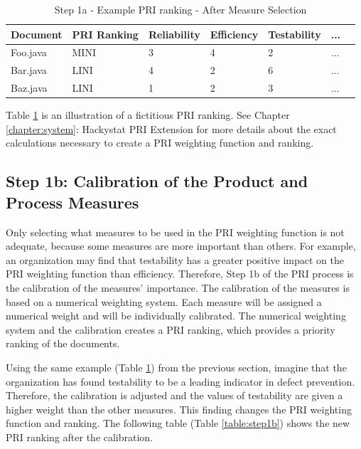 \begin{table}[htbp]
  \caption{Step 1a - Example PRI ranking - After Measure Selection}
  \label{table:step1a}
  \begin{center}
    \begin{tabular}{|l|l|l|l|l|l|l|} \hline
      {\bf Document} & {\bf PRI Ranking} & {\bf Reliability} & 
      {\bf Efficiency} & {\bf Testability} & {\bf ...} \\ \hline
Foo.java & MINI & 3 & 4 & 2 & ...  \\ \hline
Bar.java & LINI & 4 & 2 & 6 & ...  \\ \hline
Baz.java & LINI & 1 & 2 & 3 & ...  \\ \hline
    \end{tabular}
  \end{center}
\end{table}

Table \ref{table:step1a} is an illustration of a fictitious PRI ranking.
See Chapter \ref{chapter:system}: Hackystat PRI Extension for more details
about the exact calculations necessary to create a PRI weighting function
and ranking.


\subsection{Step 1b: Calibration of the Product and Process Measures}
Only selecting what measures to be used in the PRI weighting function is
not adequate, because some measures are more important than others. For
example, an organization may find that testability has a greater positive
impact on the PRI weighting function than efficiency. Therefore, Step 1b of
the PRI process is the calibration of the measures' importance. The
calibration of the measures is based on a numerical weighting system. Each
measure will be assigned a numerical weight and will be individually
calibrated. The numerical weighting system and the calibration creates a
PRI ranking, which provides a priority ranking of the documents.

Using the same example (Table \ref{table:step1a}) from the previous
section, imagine that the organization has found testability to be a
leading indicator in defect prevention. Therefore, the calibration is
adjusted and the values of testability are given a higher weight than the
other measures. This finding changes the PRI weighting function and
ranking. The following table (Table \ref{table:step1b}) shows the new PRI
ranking after the calibration.

